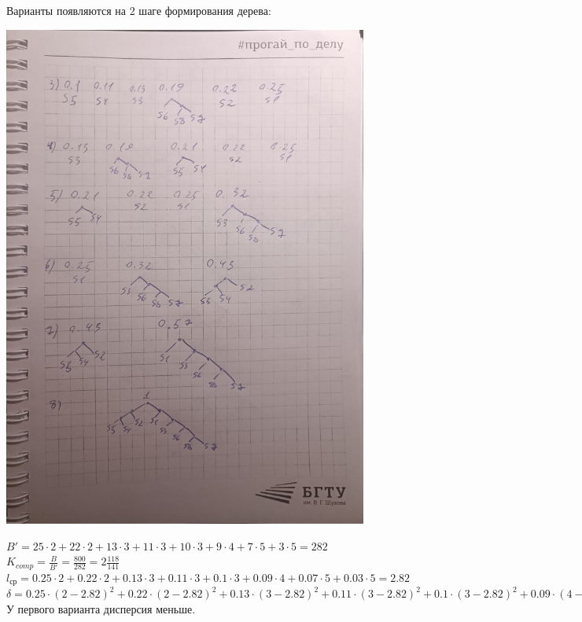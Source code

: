 \documentclass[a4paper,14pt]{extarticle}
\begin{document}
Варианты появляются на 2 шаге формирования дерева:
\begin{center}
    \includegraphics[width=120mm]{task2_var1.jpg}\\
\end{center}

$B' = 25 \cdot 2 + 22 \cdot 2 + 13 \cdot 3 + 11 \cdot 3 + 10 \cdot 3 + 9 \cdot 4 + 7 \cdot 5 + 3 \cdot 5 = 282$\\
$K_{comp} = \frac{B}{B'} = \frac{800}{282} = 2\frac{118}{141}$\\
$l_{ср} = 0.25 \cdot 2 + 0.22 \cdot 2 + 0.13 \cdot 3 + 0.11 \cdot 3 + 0.1 \cdot 3 + 0.09 \cdot 4 + 0.07 \cdot 5 + 0.03 \cdot 5 = 2.82$\\
$\delta = 0.25 \cdot (2 - 2.82)^2 + 0.22 \cdot (2 - 2.82)^2 + 0.13 \cdot (3 - 2.82)^2 + 0.11 \cdot (3 - 2.82)^2 + 0.1 \cdot (3 - 2.82)^2 + 0.09 \cdot (4 - 2.82)^2 + 0.07 \cdot (5 - 2.82)^2 + 0.03 \cdot (5 - 2.82)^2 = 0.9276$\\

У первого варианта дисперсия меньше.\\
\end{document}
